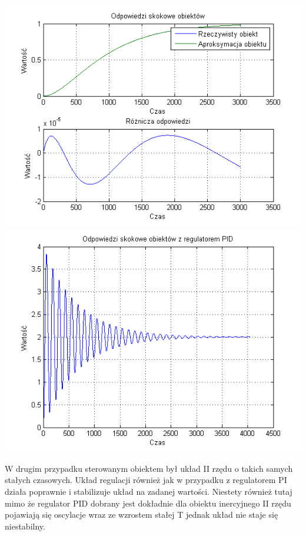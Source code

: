 \documentclass[10pt,a4paper]{article}
\begin{document}
\begin{center}
\includegraphics[scale=1]{images/dwa/skrypt_83.png}\\
\includegraphics[scale=1]{images/dwa/skrypt_84.png}\\
\end{center}
\newpage
W drugim przypadku sterowanym obiektem był układ II rzędu o takich samych stałych czasowych. Układ regulacji również jak w przypadku z regulatorem PI działa poprawnie i stabilizuje układ na zadanej wartości. Niestety również tutaj mimo że regulator PID dobrany jest dokładnie dla obiektu inercyjnego II rzędu pojawiają się oscylacje wraz ze wzrostem stałej T jednak układ nie staje się niestabilny.
\newpage
\end{document}
